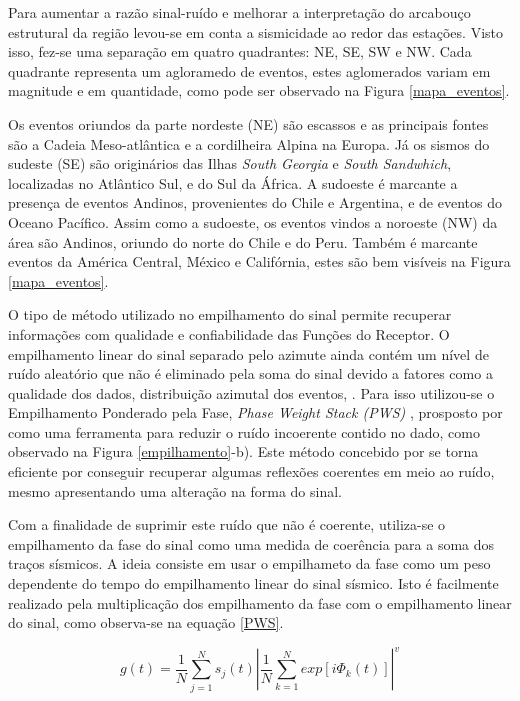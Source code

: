 Para aumentar a razão sinal-ruído e melhorar a interpretação do arcabouço estrutural da região levou-se em conta a sismicidade ao redor das estações. Visto isso, fez-se uma separação em quatro quadrantes: NE, SE, SW e NW. Cada quadrante representa um agloramedo de eventos, estes aglomerados variam em magnitude e em quantidade, como pode ser observado na Figura \ref{mapa_eventos}. 

Os eventos oriundos da parte nordeste (NE) são escassos e as principais fontes são a Cadeia Meso-atlântica e a cordilheira Alpina na Europa. Já os sismos do sudeste (SE) são originários das Ilhas \textit{South Georgia} e \textit{South Sandwhich}, localizadas no Atlântico Sul, e do Sul da África. A sudoeste é marcante a presença de eventos Andinos, provenientes do Chile e Argentina, e de eventos do Oceano Pacífico. Assim como a sudoeste, os eventos vindos a noroeste (NW) da área são Andinos, oriundo do norte do Chile e do Peru. Também é marcante eventos da América Central, México e Califórnia, estes são bem visíveis na Figura \ref{mapa_eventos}.

O tipo de método utilizado no empilhamento do sinal permite recuperar informações com qualidade e confiabilidade das Funções do Receptor. O empilhamento linear do sinal separado pelo azimute ainda contém um nível de ruído aleatório que não é eliminado pela soma do sinal devido a fatores como a qualidade dos dados, distribuição azimutal dos eventos, \cite{schimmel_noise_1997}. Para isso utilizou-se o Empilhamento Ponderado pela Fase, \textit{Phase Weight Stack (PWS)} , prosposto por \cite{schimmel_noise_1997} como uma ferramenta para reduzir o ruído  incoerente contido no dado, como observado na Figura \ref{empilhamento}-b). Este método concebido por \cite{schimmel_noise_1997} se torna eficiente por conseguir recuperar algumas reflexões coerentes em meio ao ruído, mesmo apresentando uma alteração na forma do sinal. 

Com a finalidade de suprimir este ruído que não é coerente, utiliza-se o empilhamento da fase do sinal como uma medida de coerência para a soma dos traços sísmicos. A ideia consiste em usar o empilhameto da fase como um peso dependente do tempo do empilhamento linear do sinal sísmico. Isto é facilmente realizado pela multiplicação dos empilhamento da fase com o empilhamento linear do sinal, como observa-se na equação \ref{PWS}.

\begin{equation}
\label{PWS}
g(t) = \frac{1}{N} \sum_{j=1}^{N}s_{j}(t)\left | \frac{1}{N} \sum_{k=1}^{N}exp\left [ i\Phi _{k}(t) \right ]  \right |^{v}
\end{equation}

